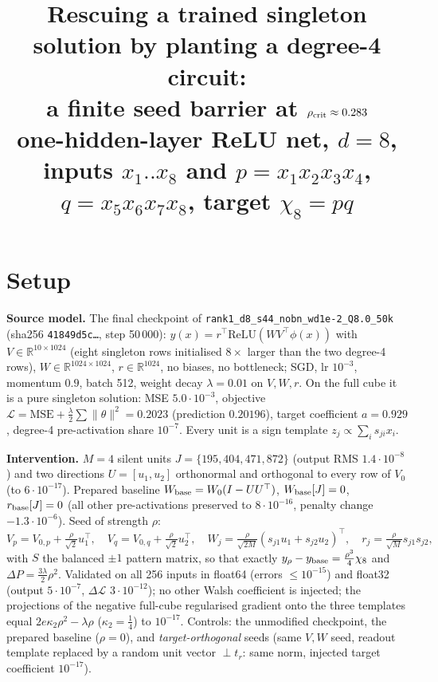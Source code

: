 \documentclass[10pt]{article}
\title{\vspace{-1.4cm}Rescuing a trained singleton solution by planting a degree-4 circuit:\\
a finite seed barrier at $\rho_{\rm crit}\approx0.283$\\
\large one-hidden-layer ReLU net, $d=8$, inputs $x_1..x_8$ and $p=x_1x_2x_3x_4$, $q=x_5x_6x_7x_8$, target $\chi_8=pq$}
\author{}\date{\vspace{-1.2cm}}
\begin{document}
\maketitle\vspace{-1.7cm}

\section*{Setup}
\textbf{Source model.} The final checkpoint of \texttt{rank1\_d8\_s44\_nobn\_wd1e-2\_Q8.0\_50k}
(sha256 \texttt{41849d5c\ldots}, step 50\,000): $y(x)=r^{\top}\mathrm{ReLU}(WV^{\top}\phi(x))$ with
$V\in\mathbb R^{10\times1024}$ (eight singleton rows initialised $8\times$ larger than the two degree-4
rows), $W\in\mathbb R^{1024\times1024}$, $r\in\mathbb R^{1024}$, no biases, no bottleneck; SGD, lr
$10^{-3}$, momentum $0.9$, batch 512, weight decay $\lambda=0.01$ on $V,W,r$. On the full cube it is a
pure singleton solution: MSE $5.0\cdot10^{-3}$, objective $\mathcal L=\mathrm{MSE}+\tfrac\lambda2\sum\|\theta\|^2
=0.2023$ (prediction $0.20196$), target coefficient $a=0.929$, degree-4 pre-activation share $10^{-7}$.
Every unit is a sign template $z_j\propto\sum_i s_{ji}x_i$.

\textbf{Intervention.} $M=4$ silent units $J=\{195,404,471,872\}$ (output RMS $1.4\cdot10^{-8}$) and two
directions $U=[u_1,u_2]$ orthonormal and orthogonal to every row of $V_0$ (to $6\cdot10^{-17}$). Prepared
baseline $W_{\rm base}=W_0(I-UU^{\top})$, $W_{\rm base}[J]=0$, $r_{\rm base}[J]=0$ (all other
pre-activations preserved to $8\cdot10^{-16}$, penalty change $-1.3\cdot10^{-6}$). Seed of strength $\rho$:
\[
V_p=V_{0,p}+\tfrac{\rho}{\sqrt2}u_1^{\top},\quad V_q=V_{0,q}+\tfrac{\rho}{\sqrt2}u_2^{\top},\quad
W_j=\tfrac{\rho}{\sqrt{2M}}(s_{j1}u_1+s_{j2}u_2)^{\top},\quad r_j=\tfrac{\rho}{\sqrt M}s_{j1}s_{j2},
\]
with $S$ the balanced $\pm1$ pattern matrix, so that exactly $y_\rho-y_{\rm base}=\tfrac{\rho^3}{4}\chi_8$
and $\Delta P=\tfrac{3\lambda}{2}\rho^2$. Validated on all 256 inputs in float64 (errors $\le10^{-15}$) and
float32 (output $5\cdot10^{-7}$, $\Delta\mathcal L$ $3\cdot10^{-12}$); no other Walsh coefficient is
injected; the projections of the negative full-cube regularised gradient onto the three templates equal
$2e\kappa_2\rho^2-\lambda\rho$ ($\kappa_2=\tfrac14$) to $10^{-17}$. Controls: the unmodified checkpoint,
the prepared baseline ($\rho=0$), and \emph{target-orthogonal} seeds (same $V,W$ seed, readout template
replaced by a random unit vector $\perp t_r$: same norm, injected target coefficient $10^{-17}$).
\end{document}
